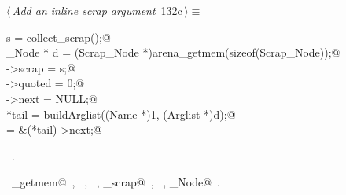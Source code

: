 \documentclass[a4paper]{report}
\begin{document}
\begin{flushleft} \small
\begin{minipage}{\linewidth}\label{scrap282}\raggedright\small
{} $\langle\,${\it Add an inline scrap argument}\nobreak\ {\footnotesize {132c}}$\,\rangle\equiv$
\vspace{-1ex}
\begin{list}{}{} \item
\mbox{}\verb@int s = collect_scrap();@\\
\mbox{}\verb@Scrap_Node * d = (Scrap_Node *)arena_getmem(sizeof(Scrap_Node));@\\
\mbox{}\verb@d->scrap = s;@\\
\mbox{}\verb@d->quoted = 0;@\\
\mbox{}\verb@d->next = NULL;@\\
\mbox{}\verb@*tail = buildArglist((Name *)1, (Arglist *)d);@\\
\mbox{}\verb@tail = &(*tail)->next;@{\NWsep}
\end{list}
\vspace{-1.5ex}
\footnotesize
\begin{list}{}{\setlength{\itemsep}{-\parsep}\setlength{\itemindent}{-\leftmargin}}
\item \NWtxtMacroRefIn\ .
\item \NWtxtIdentsUsed\nobreak\  \verb@arena_getmem@\nobreak\ , \verb@Arglist@\nobreak\ , \verb@buildArglist@\nobreak\ , \verb@collect_scrap@\nobreak\ , \verb@Name@\nobreak\ , \verb@Scrap_Node@\nobreak\ .
\item{}
\end{list}
\end{minipage}\vspace{4ex}
\end{flushleft}
\end{document}
